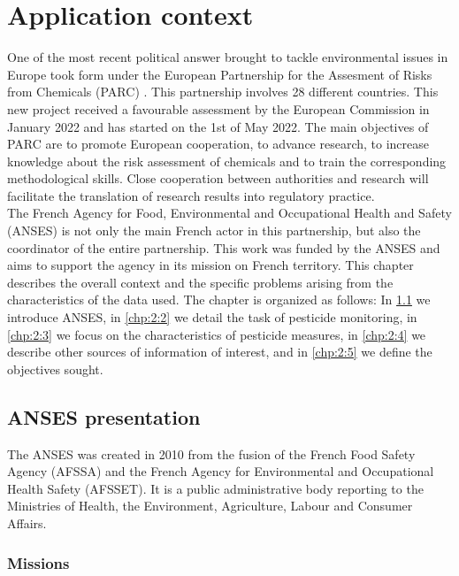 \chapter{Application context}\label{chp:2}

\minitoc

\clearpage

One of the most recent political answer brought to tackle environmental issues in Europe took form under the European Partnership for the Assesment of Risks from Chemicals (PARC) \cite{PARC}. This partnership involves 28 different countries. This new project received a favourable assessment by the European Commission in January 2022 and has started on the 1st of May 2022. The main objectives of PARC are to promote European cooperation, to advance research, to increase knowledge about the risk assessment of chemicals and to train the corresponding methodological skills. Close cooperation between authorities and research will facilitate the translation of research results into regulatory practice. \\
The French Agency for Food, Environmental and Occupational Health and Safety (ANSES) is not only the main French actor in this partnership, but also the coordinator of the entire partnership. This work was funded by the ANSES and aims to support the agency in its mission on French territory. This chapter describes the overall context and the specific problems arising from the characteristics of the data used. The chapter is organized as follows: In \ref{chp:2:1} we introduce ANSES, in \ref{chp:2:2} we detail the task of pesticide monitoring, in \ref{chp:2:3} we focus on the characteristics of pesticide measures, in \ref{chp:2:4} we describe other sources of information of interest, and in \ref{chp:2:5} we define the objectives sought.    

\section{ANSES presentation}\label{chp:2:1}

The ANSES was created in 2010 from the fusion of the French Food Safety Agency (AFSSA) and the French Agency for Environmental and Occupational Health Safety (AFSSET). It is a public administrative body reporting to the Ministries of Health, the Environment, Agriculture, Labour and Consumer Affairs.  

\subsection{Missions} 

